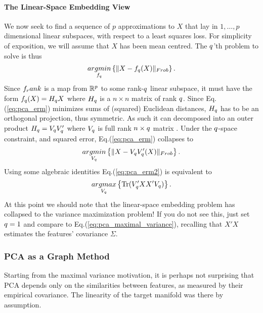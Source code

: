\paragraph{The Linear-Space Embedding View}
We now seek to find a sequence of $p$ approximations to $X$ that lay in $1,\dots,p$ dimensional linear subspaces, with respect to a least squares loss. For simplicity of exposition, we will assume that $X$ has been mean centred. 
The $q$'th problem to solve is thus
\begin{align}
\label{eq:pca_erm}
	\mathop{argmin} _{f_q}\left\{ \Vert X-f_q(X) \Vert_{Frob} \right\}.
\end{align}
Since $f_rank$ is a map from $\mathbb{R}^p$ to some rank-$q$ linear subspace, it must have the form $f_q(X)=H_q X$ where $H_q$ is a $n \times n$ matrix of rank $q$.
Since Eq.(\ref{eq:pca_erm}) minimizes sums of (squared) Euclidean distances, $H_q$ has to be an orthogonal projection, thus symmetric. As such it can decomposed into an outer product $H_q=V_q V'_q$ where $V_q$ is full rank $n \times q$ matrix \citep[Eq.(5.13.4)]{meyer_matrix_2001}.
Under the $q$-space constraint, and squared error, Eq.(\ref{eq:pca_erm}) collapses to 
\begin{align}
\label{eq:pca_erm2}
	\mathop{argmin} _{V_q}\left\{ \Vert X-V_q V'_q(X) \Vert_{Frob} \right\}.
\end{align}
Using some algebraic identities \cite[Eq.(23.3)]{shalev-shwartz_understanding_2014} Eq.(\ref{eq:pca_erm2}) is equivalent to 
\begin{align}
\label{eq:pca_erm3}
	\mathop{argmax}_{V_q}\left\{ \operatorname{Tr}(V'_q XX' V_q) \right\}.		
\end{align}
At this point we should note that the linear-space embedding problem has collapsed to the variance maximization problem! 
If you do not see this, just set $q=1$ and compare to Eq.(\ref{eq:pca_maximal_variance}), recalling that $X'X$ estimates the features' covariance $\Sigma$.






\subsubsection{PCA as a Graph Method}
\label{remark:pca_as_graph}
Starting from the maximal variance motivation, it is perhaps not surprising that PCA depends only on the similarities between features, as measured by their empirical covariance. The linearity of the target manifold was there by assumption. 

